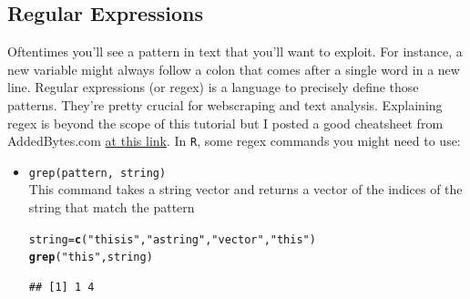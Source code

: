 \documentclass{article}\usepackage[]{graphicx}\usepackage[]{color}
\makeatletter
\newcommand{\hlstr}[1]{\textcolor[rgb]{0.192,0.494,0.8}{#1}}%
\newcommand{\hlstd}[1]{\textcolor[rgb]{0.345,0.345,0.345}{#1}}%
\newcommand{\hlkwb}[1]{\textcolor[rgb]{0.69,0.353,0.396}{#1}}%
\newcommand{\hlkwd}[1]{\textcolor[rgb]{0.737,0.353,0.396}{\textbf{#1}}}%
\newenvironment{kframe}{%
 \def\at@end@of@kframe{}%
 \ifinner\ifhmode%
  \def\at@end@of@kframe{\end{minipage}}%
  \begin{minipage}{\columnwidth}%
 \fi\fi%
 \def\FrameCommand##1{\hskip\@totalleftmargin \hskip-\fboxsep
 \colorbox{shadecolor}{##1}\hskip-\fboxsep
     \hskip-\linewidth \hskip-\@totalleftmargin \hskip\columnwidth}%
 \MakeFramed {\advance\hsize-\width
   \@totalleftmargin\z@ \linewidth\hsize
   \@setminipage}}%
 {\par\unskip\endMakeFramed%
 \at@end@of@kframe}
\newenvironment{knitrout}{}{} %
\makeatother
\begin{document}
\subsection{Regular Expressions}
Oftentimes you'll see a pattern in text that you'll want to exploit. For instance, a new variable might always follow a colon that comes after  a single word in a new line. Regular expressions (or regex) is a language to precisely define those patterns. They're pretty crucial for webscraping and text analysis. Explaining regex is beyond the scope of this tutorial but I posted a good cheatsheet from AddedBytes.com \href{http://stanford.edu/~wpmarble/webscraping_tutorial/regex_cheatsheet.pdf}{at this link}. In \texttt{R}, some regex commands you might need to use:
\begin{itemize}
  \item \verb!grep(pattern, string)! \\
  This command takes a string vector and returns a vector of the indices of the string that match the pattern
\begin{knitrout}
\color{fgcolor}\begin{kframe}
\begin{alltt}
\hlstd{string} \hlkwb{=} \hlkwd{c}\hlstd{(}\hlstr{"this is"}\hlstd{,} \hlstr{"a string"}\hlstd{,} \hlstr{"vector"}\hlstd{,} \hlstr{"this"}\hlstd{)}
\hlkwd{grep}\hlstd{(}\hlstr{"this"}\hlstd{, string)}
\end{alltt}
\begin{verbatim}
## [1] 1 4
\end{verbatim}
\end{kframe}
\end{knitrout}
  

\end{itemize}
\end{document}
